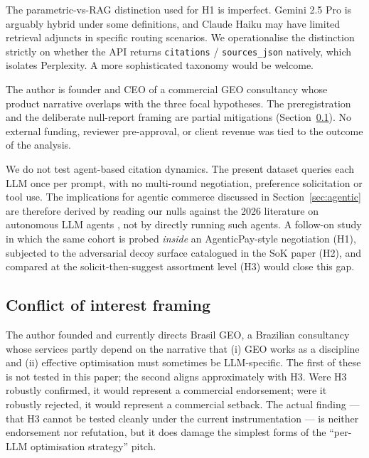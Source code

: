 \documentclass[preprint,12pt,authoryear]{elsarticle}
\begin{document}
\begin{description}[style=nextline,leftmargin=1em,itemsep=0.2em]
\item[(L10)] The parametric-vs-RAG distinction used for H1 is imperfect. Gemini 2.5 Pro is arguably hybrid under some definitions, and Claude Haiku may have limited retrieval adjuncts in specific routing scenarios. We operationalise the distinction strictly on whether the API returns \texttt{citations} / \texttt{sources\_json} natively, which isolates Perplexity. A more sophisticated taxonomy would be welcome.
\item[(L11)] The author is founder and CEO of a commercial GEO consultancy whose product narrative overlaps with the three focal hypotheses. The preregistration and the deliberate null-report framing are partial mitigations (Section~\ref{subsec:coi}). No external funding, reviewer pre-approval, or client revenue was tied to the outcome of the analysis.
\item[(L12)] We do not test agent-based citation dynamics. The present dataset queries each LLM once per prompt, with no multi-round negotiation, preference solicitation or tool use. The implications for agentic commerce discussed in Section~\ref{sec:agentic} are therefore derived by reading our nulls against the 2026 literature on autonomous LLM agents \citep{Liu2026AgenticPay, Cao2026Solicit, Mao2026SoK}, not by directly running such agents. A follow-on study in which the same cohort is probed \emph{inside} an AgenticPay-style negotiation (H1), subjected to the adversarial decoy surface catalogued in the SoK paper (H2), and compared at the solicit-then-suggest assortment level (H3) would close this gap.
\end{description}

\subsection{Conflict of interest framing}\label{subsec:coi}
The author founded and currently directs Brasil GEO, a Brazilian consultancy whose services partly depend on the narrative that (i) GEO works as a discipline and (ii) effective optimisation must sometimes be LLM-specific. The first of these is not tested in this paper; the second aligns approximately with H3. Were H3 robustly confirmed, it would represent a commercial endorsement; were it robustly rejected, it would represent a commercial setback. The actual finding --- that H3 cannot be tested cleanly under the current instrumentation --- is neither endorsement nor refutation, but it does damage the simplest forms of the ``per-LLM optimisation strategy'' pitch.
\end{document}
